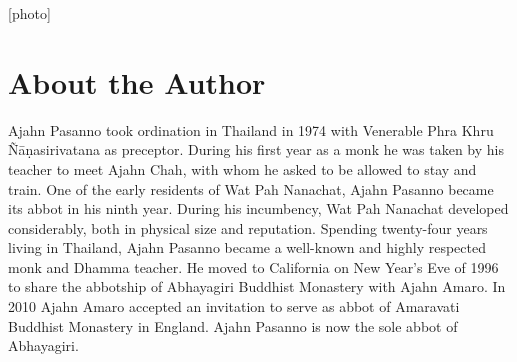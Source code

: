 \thispagestyle{empty}

\vspace*{1.75in}
{\center

{[}photo{]}

}

\clearpage

\chapter{About the Author}

Ajahn Pasanno took ordination in Thailand in 1974 with Venerable Phra
Khru Ñāṇasirivatana as preceptor. During his first year as a monk he was
taken by his teacher to meet Ajahn Chah, with whom he asked to be
allowed to stay and train. One of the early residents of Wat Pah
Nanachat, Ajahn Pasanno became its abbot in his ninth year. During his
incumbency, Wat Pah Nanachat developed considerably, both in physical
size and reputation. Spending twenty-four years living in Thailand,
Ajahn Pasanno became a well-known and highly respected monk and Dhamma
teacher. He moved to California on New Year’s Eve of 1996 to share the
abbotship of Abhayagiri Buddhist Monastery with Ajahn Amaro. In 2010
Ajahn Amaro accepted an invitation to serve as abbot of Amaravati
Buddhist Monastery in England. Ajahn Pasanno is now the sole abbot of
Abhayagiri.
